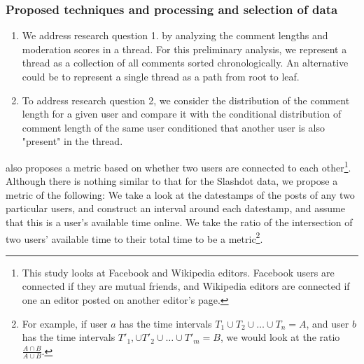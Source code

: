\documentclass[a4paper,12pt]{article}
\numberwithin{equation}{section}
\begin{document}



\subsubsection*{Proposed techniques and processing and selection of data}
\begin{enumerate}
\item We address research question 1. by analyzing the comment lengths and moderation scores in a thread. For this preliminary analysis, we represent a thread as a collection of all comments sorted chronologically. An alternative could be to represent a single thread as a path from root to leaf. 

\item To address research question 2, we consider the distribution of the comment length for a given user and compare it with the conditional distribution of comment length of the same user conditioned that another user is also "present" in the thread. 
\end{enumerate}




\cite{Backstrom+al:13a} also proposes a metric based on whether two users are connected to each other\footnote{This study looks at Facebook and Wikipedia editors. Facebook users are connected if they are mutual friends, and Wikipedia editors are connected if one an editor posted on another editor's page.}. Although there is nothing similar to that for the Slashdot data, we propose a metric of the following: We take a look at the datestamps of the posts of any two particular users, and construct an interval around each datestamp, and assume that this is a user's available time online. We take the ratio of the intersection of two users' available time to their total time to be a metric\footnote{For example, if user $a$ has the time intervals $T_1 \cup T_2 \cup \hdots \cup T_n = A$, and user $b$ has the time intervals $T'_1, \cup T'_2 \cup \hdots \cup T'_m = B$, we would look at the ratio $\frac{A \cap B}{A \cup B}$. }. 
\end{document}
